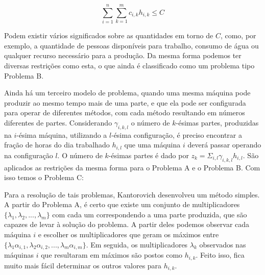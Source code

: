 \begin{equation}
  \sum_{i=1}^n \sum_{k=1}^m c_{i, k} h_{i, k} \leq C
\end{equation}

Podem existir vários significados sobre as quantidades em torno de \(C\), como, por exemplo,
a quantidade de pessoas disponíveis para trabalho, consumo de água ou qualquer recurso
necessário para a produção. Da mesma forma podemos ter diversas restrições como esta,
o que ainda é classificado como um problema tipo Problema B.

Ainda há um terceiro modelo de problema, quando uma mesma máquina pode produzir ao mesmo tempo
mais de uma parte, e que ela pode ser configurada para operar de diferentes métodos, com cada
método resultando em números diferentes de partes. Considerando \( \gamma_{i, k, l} \) o número de
\(k\)-ésimas partes, produzidas na \(i\)-ésima máquina, utilizando a \(l\)-ésima configuração,
é preciso encontrar a fração de horas do dia trabalhado \(h_{i, l}\) que uma máquina \(i\) deverá
passar operando na configuração \(l\). O número de \(k\)-ésimas partes é dado por
\( z_k = \Sigma_{i, l} \gamma_{i, k, l} h_{i, l}\). São aplicados as restrições da mesma forma para o Problema
A e o Problema B. Com isso temos o Problema C:

\begin{maxi!}
{}{  \label{kobj}}{\label{prob_kantorovich}}{}
\end{maxi!}

Para a resolução de tais problemas, Kantorovich desenvolveu um método simples. A partir do
Problema A, é certo que existe um conjunto de multiplicadores \(\{ \lambda_1, \lambda_2, ..., \lambda_m \}\) com
cada um correspondendo a uma parte produzida, que são capazes de levar à solução do problema.
A partir deles podemos observar cada máquina \(i\) e escolher os multiplicadores que geram os
máximos entre \(\{\lambda_1\alpha_{i, 1}, \lambda_2\alpha_{i, 2}, ..., \lambda_m\alpha_{i, m}\}\). Em seguida, os multiplicadores \( \lambda_k \)
observados nas máquinas \(i\) que resultaram em máximos são postos como \(h_{i, k}\). Feito isso,
fica muito mais fácil determinar os outros valores para \( h_{i, k} \).

